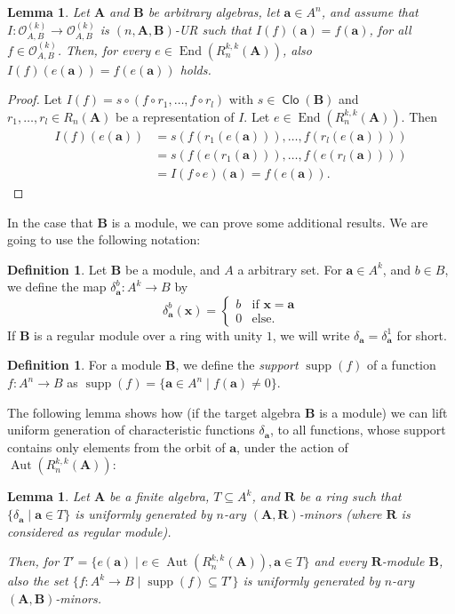 \documentclass[11pt]{amsart}
\theoremstyle{plain}
\newtheorem{lemma}[thm]{Lemma}
\theoremstyle{definition}
\newtheorem{definition}[thm]{Definition}
\DeclareMathOperator{\Aut}{Aut}
\DeclareMathOperator{\End}{End}
\newcommand{\alg}[1]{\mathbf{#1}}
\newcommand{\clonoid}[1]{\mathcal{#1}}
\newcommand{\clodO}{\clonoid{O}}
\newcommand{\algA}{\alg{A}}
\newcommand{\algB}{\alg{B}}
\newcommand{\algR}{\alg{R}}
\renewcommand\vec{\mathbf}
\newcommand{\va}{\vec{a}}
\newcommand{\vx}{\vec{x}}
\DeclareMathOperator{\Clo}{\mathsf{Clo}}
\DeclareMathOperator{\supp}{supp}
\begin{document}
\begin{lemma} \label{lemma:endomorphisms}
Let $\algA$ and $\algB$ be arbitrary algebras, let $\va \in A^n$, and assume that $I\colon \clodO_{A,B}^{(k)} \to \clodO_{A,B}^{(k)}$ is $(n,\algA,\algB)$-UR such that $I(f)(\va) = f(\va)$, for all $f \in \clodO_{A,B}^{(k)}$. Then, for every $e \in \End( R_n^{k,k}(\algA))$, also $I(f)(e(\va)) = f(e(\va))$ holds.
\end{lemma}

\begin{proof}
Let $I(f) = s\circ (f\circ r_1, \ldots, f\circ r_l)$ with $s \in \Clo(\algB)$ and $r_1,\ldots,r_l \in R_n(\algA)$ be a representation of $I$. Let $e \in \End(R_n^{k,k}(\algA))$. Then 
\begin{align*}
I(f)(e(\va)) &= s (f(r_1(e(\va))), \ldots, f(r_l(e(\va))))\\
&= s (f(e(r_1(\va))), \ldots, f(e(r_l(\va))))\\
&= I(f\circ e)(\va) = f(e(\va)).
\end{align*}
\end{proof}


In the case that $\algB$ is a module, we can prove some additional results. We are going to use the following notation:

\begin{definition}
Let $\algB$ be a module, and $A$ a arbitrary set. For $\va \in A^k$, and  $b \in B$, we define the map $\delta_\va^b \colon A^k \to B$ by 
$$
\delta_\va^b(\vx) = \begin{cases} b & \text{if } \vx = \va \\ 0 &\text{else.} \end{cases}
$$
If $\algB$ is a regular module over a ring with unity $1$, we will write $\delta_\va = \delta_\va^1$ for short.
\end{definition}

\begin{definition}
For a module $\algB$, we define the \emph{support} $\supp(f)$ of a function $f\colon A^n\to B$ as $\supp(f) = \{\va \in A^n \mid f(\va) \neq 0\}$.
\end{definition}

The following lemma shows how (if the target algebra $\algB$ is a module) we can lift uniform generation of characteristic functions $\delta_\va$, to all functions, whose support contains only elements from the orbit of $\va$, under the action of $\Aut(R_n^{k,k}(\algA))$:

\begin{lemma} \label{lemma:orbitsupport}
Let $\algA$ be a finite algebra, $T \subseteq A^k$, and $\algR$ be a ring such that $\{\delta_\va \mid \va \in T\}$ is uniformly generated by $n$-ary $(\algA,\algR)$-minors (where $\algR$ is considered as regular module).

Then, for $T' = \{ e(\va) \mid e \in \Aut(R_n^{k,k}(\algA)), \va \in T \}$ and every $\algR$-module $\algB$, also the set $\{ f\colon A^k\to B \mid \supp(f) \subseteq T' \}$ is uniformly generated by $n$-ary $(\algA,\algB)$-minors.
\end{lemma}
\end{document}
